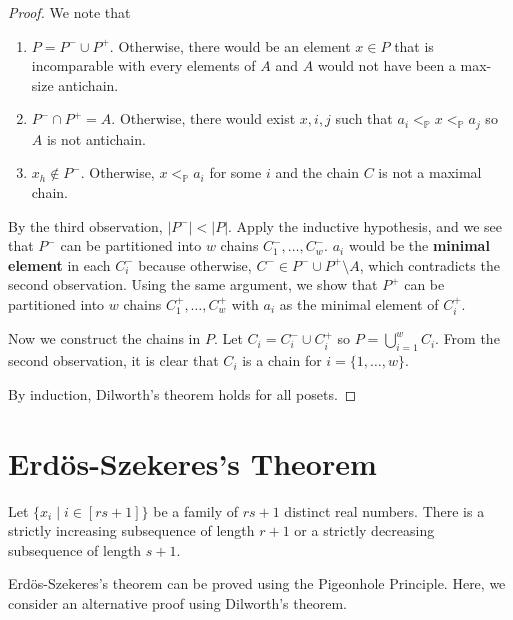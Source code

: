 \begin{proof}
    We note that
    \begin{enumerate}
        \item $P = P^- \cup P^+$. Otherwise, there would be an element $x \in P$ that is incomparable with every elements of $A$ and $A$ would not have been a max-size antichain.
        \item $P^- \cap P^+ = A$. Otherwise, there would exist $x,i,j$ such that $a_i <_{\mathbb{P}} x <_{\mathbb{P}} a_j$ so $A$ is not antichain.
        \item $x_h \not\in P^-$. Otherwise, $x <_{\mathbb{P}} a_i$ for some $i$ and the chain $C$ is not a maximal chain.
    \end{enumerate}

    By the third observation, $|P^-| < |P|$. Apply the inductive hypothesis, and we see that $P^-$ can be partitioned into $w$ chains $C^-_1,\ldots, C^-_w$. $a_i$ would be the \textbf{minimal element} in each $C^-_i$ because otherwise, $C^- \in P^- \cup P^+ \setminus A$, which contradicts the second observation. Using the same argument, we show that $P^+$ can be partitioned into $w$ chains $C^+_1,\ldots,C^+_w$ with $a_i$ as the minimal element of $C^+_i$.

    Now we construct the chains in $P$. Let $C_i = C^-_i \cup C^+_i$ so $P = \bigcup_{i=1}^w C_i$. From the second observation, it is clear that $C_i$ is a chain for $i = \{1,\ldots,w\}$.

    By induction, Dilworth's theorem holds for all posets.
\end{proof}

\section{Erd\"os-Szekeres's Theorem}

\begin{theorem}
    Let $\{x_i \mid i \in [rs + 1]\}$ be a family of $rs + 1$ distinct real numbers. There is a strictly increasing subsequence of length $r+1$ or a strictly decreasing subsequence of length $s+1$.
\end{theorem}

Erd\"os-Szekeres's theorem can be proved using the Pigeonhole Principle. Here, we consider an alternative proof using Dilworth's theorem.

